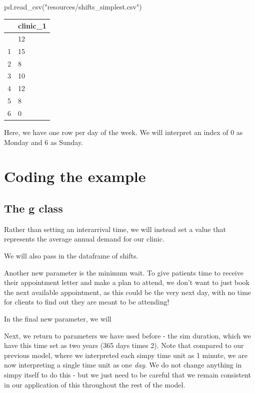 \documentclass[
  letterpaper,
  DIV=11,
  numbers=noendperiod]{scrreprt}
\newenvironment{Shaded}{}{}
\newcommand{\NormalTok}[1]{\textcolor[rgb]{0.14,0.16,0.18}{#1}}
\newcommand{\StringTok}[1]{\textcolor[rgb]{0.01,0.18,0.38}{#1}}
\begin{document}
\begin{Shaded}
\begin{Highlighting}[]
\NormalTok{pd.read\_csv(}\StringTok{"resources/shifts\_simplest.csv"}\NormalTok{)}
\end{Highlighting}
\end{Shaded}

\begin{longtable}[]{@{}ll@{}}
\toprule\noalign{}
& clinic\_1 \\
\midrule\noalign{}
\endhead
\bottomrule\noalign{}
\endlastfoot
0 & 12 \\
1 & 15 \\
2 & 8 \\
3 & 10 \\
4 & 12 \\
5 & 8 \\
6 & 0 \\
\end{longtable}

Here, we have one row per day of the week. We will interpret an index of
0 as Monday and 6 as Sunday.

\section{Coding the example}\label{coding-the-example}

\subsection{The g class}\label{the-g-class-10}

Rather than setting an interarrival time, we will instead set a value
that represents the average annual demand for our clinic.

We will also pass in the dataframe of shifts.

Another new parameter is the minimum wait. To give patients time to
receive their appointment letter and make a plan to attend, we don't
want to just book the next available appointment, as this could be the
very next day, with no time for clients to find out they are meant to be
attending!

In the final new parameter, we will

Next, we return to parameters we have used before - the sim duration,
which we have this time set as two years (365 days times 2). Note that
compared to our previous model, where we interpreted each simpy time
unit as 1 minute, we are now interpreting a single time unit as one
\emph{day}. We do not change anything in simpy itself to do this - but
we just need to be careful that we remain consistent in our application
of this throughout the rest of the model.
\end{document}
